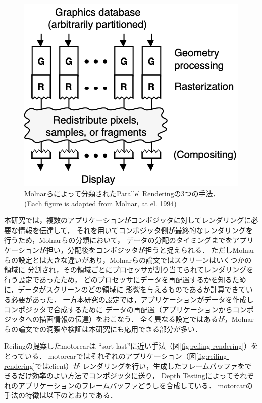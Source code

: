 \begin{figure}[htbp]
\begin{minipage}[t]{0.32\linewidth}
  \end{minipage}
  \begin{minipage}[t]{0.32\linewidth}
    \centering
    \includegraphics[keepaspectratio, width=\linewidth]{figures/sort-last.png}
  \end{minipage}
  \caption{
    Molnarらによって分類されたParallel Renderingの3つの手法．
    (Each figure is adapted from Molnar, at el. 1994\cite{parallel-rendering})
  }
  \label{fig:parallel-rendering}
\end{figure}

本研究では，複数のアプリケーションがコンポジッタに対してレンダリングに必要な情報を伝達して，
それを用いてコンポジッタ側が最終的なレンダリングを行うため，Molnarらの分類において，
データの分配のタイミングまでをアプリケーションが担い，分配後をコンポジッタが担うと捉えられる．
ただしMolnarらの設定とは大きな違いがあり，Molnarらの論文ではスクリーンはいくつかの領域に
分割され，その領域ごとにプロセッサが割り当てられてレンダリングを行う設定であったため，
どのプロセッサにデータを再配置するかを知るために，データがスクリーンのどの領域に
影響を与えるものであるか計算できている必要があった．
一方本研究の設定では，アプリケーションがデータを作成しコンポジッタで合成するために
データの再配置（アプリケーションからコンポジッタへの描画情報の伝達）をおこなう．
全く異なる設定ではあるが，Molnarらの論文での洞察や検証は本研究にも応用できる部分が多い．

Reilingの提案したmotorcar\cite{reiling}は
``sort-last''に近い手法（図\ref{fig:reiling-rendering}）をとっている．
motorcarではそれぞれのアプリケーション（図\ref{fig:reiling-rendering}ではclient）が
レンダリングを行い，生成したフレームバッファをできるだけ効率のよい方法でコンポジッタに送り，
Depth Testingによってそれぞれのアプリケーションのフレームバッファどうしを合成している．
motorcarの手法の特徴は以下のとおりである．


